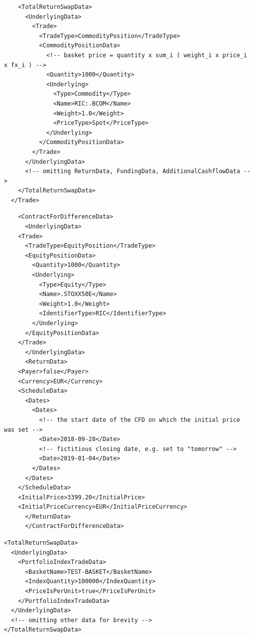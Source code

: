 \begin{listing}[H]
\begin{verbatim}
    <TotalReturnSwapData>
      <UnderlyingData>
        <Trade>
          <TradeType>CommodityPosition</TradeType>
          <CommodityPositionData>
            <!-- basket price = quantity x sum_i ( weight_i x price_i x fx_i ) -->
            <Quantity>1000</Quantity>
            <Underlying>
              <Type>Commodity</Type>
              <Name>RIC:.BCOM</Name>
              <Weight>1.0</Weight>
              <PriceType>Spot</PriceType>
            </Underlying>
          </CommodityPositionData>
        </Trade>
      </UnderlyingData>
      <!-- omitting ReturnData, FundingData, AdditionalCashflowData -->
    </TotalReturnSwapData>
  </Trade>
\end{verbatim}
\caption{Generic Total Return Swap on a commodity index underlying}
\label{lst:trsdata5}
\end{listing}

\begin{listing}[H]
\begin{verbatim}
    <ContractForDifferenceData>
      <UnderlyingData>
	<Trade>
	  <TradeType>EquityPosition</TradeType>
	  <EquityPositionData>
	    <Quantity>1000</Quantity>
	    <Underlying>
	      <Type>Equity</Type>
	      <Name>.STOXX50E</Name>
	      <Weight>1.0</Weight>
	      <IdentifierType>RIC</IdentifierType>
	    </Underlying>
	  </EquityPositionData>
	</Trade>
      </UnderlyingData>
      <ReturnData>
	<Payer>false</Payer>
	<Currency>EUR</Currency>
	<ScheduleData>
	  <Dates>
	    <Dates>
	      <!-- the start date of the CFD on which the initial price was set -->
	      <Date>2018-09-28</Date>
	      <!-- fictitious closing date, e.g. set to "tomorrow" -->
	      <Date>2019-01-04</Date>
	    </Dates>
	  </Dates>
	</ScheduleData>
	<InitialPrice>3399.20</InitialPrice>
	<InitialPriceCurrency>EUR</InitialPriceCurrency>
      </ReturnData>
      </ContractForDifferenceData>
\end{verbatim}
\caption{CFD on STOXX50E with initial price 3399.20 EUR}
\label{lst:trsdata_cfd}
\end{listing}

\begin{listing}[H]
\begin{verbatim}
<TotalReturnSwapData>
  <UnderlyingData>
    <PortfolioIndexTradeData>
      <BasketName>TEST-BASKET</BasketName>
      <IndexQuantity>100000</IndexQuantity>
      <PriceIsPerUnit>true</PriceIsPerUnit>
    </PortfolioIndexTradeData>
  </UnderlyingData>
  <!-- omitting other data for brevity -->
</TotalReturnSwapData>
\end{verbatim}
\caption{Generic TRS on a \lstinline!PortfolioIndexTradeData! underlying}
\label{lst:trsdata_pitd_bond-future-option}
\end{listing}

